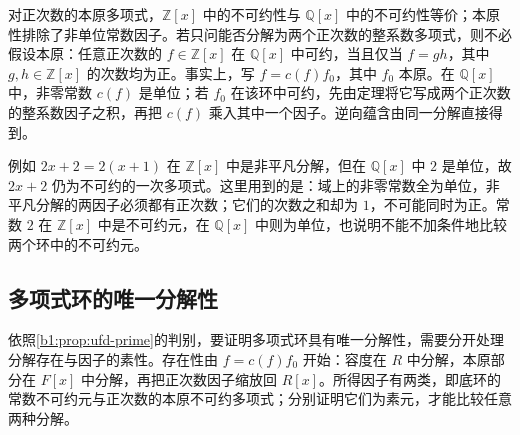 对正次数的本原多项式，\(\mathbb Z[x]\) 中的不可约性与 \(\mathbb Q[x]\) 中的不可约性等价；本原性排除了非单位常数因子。若只问能否分解为两个正次数的整系数多项式，则不必假设本原：任意正次数的 \(f\in\mathbb Z[x]\) 在 \(\mathbb Q[x]\) 中可约，当且仅当 \(f=gh\)，其中 \(g,h\in\mathbb Z[x]\) 的次数均为正。事实上，写 \(f=c(f)f_0\)，其中 \(f_0\) 本原。在 \(\mathbb Q[x]\) 中，非零常数 \(c(f)\) 是单位；若 \(f_0\) 在该环中可约，先由定理将它写成两个正次数的整系数因子之积，再把 \(c(f)\) 乘入其中一个因子。逆向蕴含由同一分解直接得到。

\ProseParagraphBreak
例如 \(2x+2=2(x+1)\) 在 \(\mathbb Z[x]\) 中是非平凡分解，但在 \(\mathbb Q[x]\) 中 \(2\) 是单位，故 \(2x+2\) 仍为不可约的一次多项式。这里用到的是：域上的非零常数全为单位，非平凡分解的两因子必须都有正次数；它们的次数之和却为 \(1\)，不可能同时为正。常数 \(2\) 在 \(\mathbb Z[x]\) 中是不可约元，在 \(\mathbb Q[x]\) 中则为单位，也说明不能不加条件地比较两个环中的不可约元。

\subsection{多项式环的唯一分解性}
\label{b1:subsec:1202:03}

依照\cref{b1:prop:ufd-prime}的判别，要证明多项式环具有唯一分解性，需要分开处理分解存在与因子的素性。存在性由 \(f=c(f)f_0\) 开始：容度在 \(R\) 中分解，本原部分在 \(F[x]\) 中分解，再把正次数因子缩放回 \(R[x]\)。所得因子有两类，即底环的常数不可约元与正次数的本原不可约多项式；分别证明它们为素元，才能比较任意两种分解。

